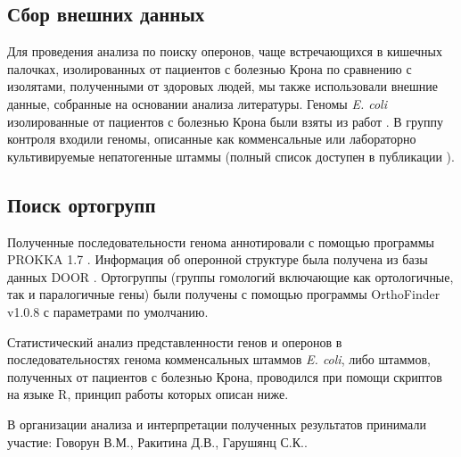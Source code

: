 \subsection{Сбор внешних данных}
Для проведения анализа по поиску оперонов, чаще встречающихся в кишечных палочках, изолированных от пациентов с болезнью Крона по сравнению с изолятами, полученными от здоровых людей, мы также использовали внешние данные, собранные на основании анализа литературы. Геномы \textit{E. coli} изолированные от пациентов с болезнью Крона были взяты из работ \cite{nash2010genome, miquel2010complete, krause2011complete}. В группу контроля входили геномы, описанные как комменсальные или лабораторно культивируемые непатогенные штаммы (полный список доступен в публикации \cite{rakitina2017genome}).

\subsection{Поиск ортогрупп}
Полученные последовательности генома аннотировали с помощью программы PROKKA 1.7 \cite{seemann2014prokka}. Информация об оперонной структуре была получена из базы данных DOOR \cite{mao2014door}. Ортогруппы (группы гомологий включающие как ортологичные, так и паралогичные гены) были получены с помощью программы OrthoFinder v1.0.8 \cite{emms2015orthofinder} с параметрами по умолчанию. 

Статистический анализ представленности генов и оперонов в последовательностях генома комменсальных штаммов \textit{E. coli}, либо штаммов, полученных от пациентов с болезнью Крона, проводился при помощи скриптов на языке R, принцип работы которых описан ниже.

В организации анализа и интерпретации полученных результатов принимали участие: Говорун В.М., Ракитина Д.В., Гарушянц С.К..
